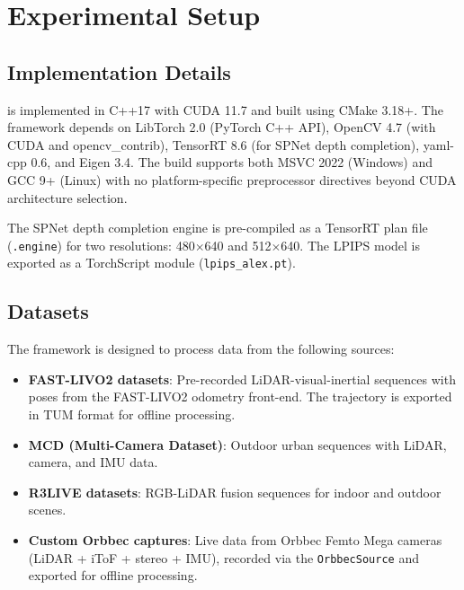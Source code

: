 \section{Experimental Setup}
\label{sec:experiments}

\subsection{Implementation Details}

\winlic{} is implemented in C++17 with CUDA 11.7 and built using CMake 3.18+.
The framework depends on LibTorch 2.0 (PyTorch C++ API), OpenCV 4.7 (with
CUDA and opencv\_contrib), TensorRT 8.6 (for SPNet depth completion),
yaml-cpp 0.6, and Eigen 3.4. The build supports both MSVC 2022 (Windows)
and GCC 9+ (Linux) with no platform-specific preprocessor directives
beyond CUDA architecture selection.

The SPNet depth completion engine is pre-compiled as a TensorRT plan file
(\texttt{.engine}) for two resolutions: 480$\times$640 and 512$\times$640.
The LPIPS model is exported as a TorchScript module (\texttt{lpips\_alex.pt}).

\subsection{Datasets}

The framework is designed to process data from the following sources:

\begin{itemize}
    \item \textbf{FAST-LIVO2 datasets}: Pre-recorded LiDAR-visual-inertial
    sequences with poses from the FAST-LIVO2 odometry front-end. The
    trajectory is exported in TUM format for offline processing.

    \item \textbf{MCD (Multi-Camera Dataset)}: Outdoor urban sequences
    with LiDAR, camera, and IMU data.

    \item \textbf{R3LIVE datasets}: RGB-LiDAR fusion sequences for
    indoor and outdoor scenes.

    \item \textbf{Custom Orbbec captures}: Live data from Orbbec Femto
    Mega cameras (LiDAR + iToF + stereo + IMU), recorded via the
    \texttt{OrbbecSource} and exported for offline processing.
\end{itemize}

